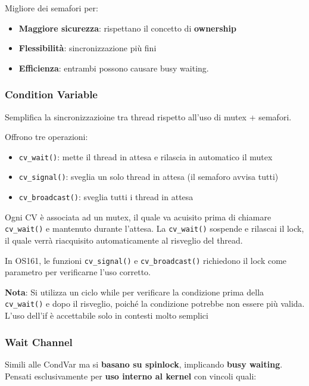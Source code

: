 Migliore dei semafori per:

\begin{itemize}
  \item \textbf{Maggiore sicurezza}: rispettano il concetto di \textbf{ownership}
  \item \textbf{Flessibilità}: sincronizzazione più fini
  \item \textbf{Efficienza}: entrambi possono causare busy waiting.
\end{itemize}



\subsubsection{Condition Variable}

Semplifica la sincronizzazioine tra thread rispetto all'uso di mutex + semafori.

Offrono tre operazioni:

\begin{itemize}
  \item \verb|cv_wait()|: mette il thread in attesa e rilascia in automatico il mutex
  \item \verb|cv_signal()|: sveglia un solo thread in attesa (il semaforo avvisa tutti)
  \item \verb|cv_broadcast()|: sveglia tutti i thread in attesa
\end{itemize}

Ogni CV è associata ad un mutex, il quale va acuisito prima di chiamare \verb|cv_wait()| e mantenuto durante l'attesa.
La \verb|cv_wait()| sospende e rilascai il lock, il quale verrà riacquisito automaticamente al risveglio del thread.


In OS161, le funzioni \verb|cv_signal()| e \verb|cv_broadcast()| richiedono il lock come parametro
per verificarne l'uso corretto.


\begin{tcolorbox}
  \textbf{Nota}: Si utilizza un ciclo while per verificare la condizione prima
  della \verb|cv_wait()| e dopo il risveglio, poiché la condizione potrebbe non essere
  più valida. L'uso dell'if è accettabile solo in contesti molto semplici
\end{tcolorbox}


\subsubsection{Wait Channel}


Simili alle CondVar ma si \textbf{basano su spinlock}, implicando \textbf{busy waiting}.
Pensati esclusivamente per \textbf{uso interno al kernel} con vincoli quali:

